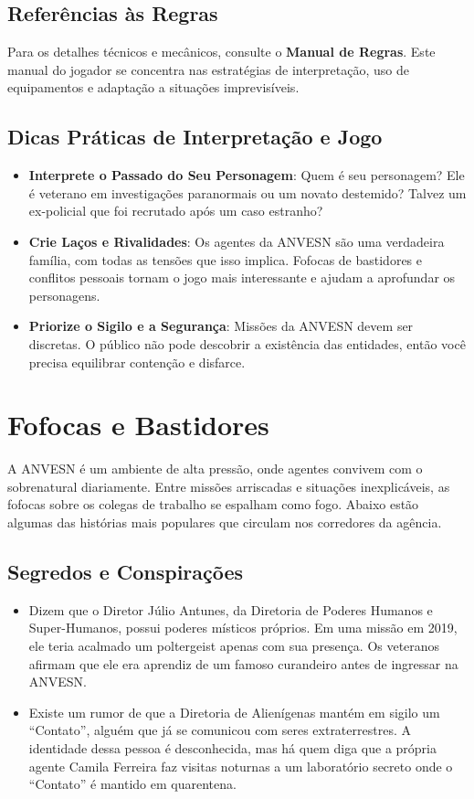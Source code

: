 \documentclass{book}
\begin{document}
\section{Referências às Regras}
Para os detalhes técnicos e mecânicos, consulte o \textbf{Manual de Regras}. Este manual do jogador se concentra nas estratégias de interpretação, uso de equipamentos e adaptação a situações imprevisíveis.

\section{Dicas Práticas de Interpretação e Jogo}
\begin{itemize}
    \item \textbf{Interprete o Passado do Seu Personagem}: Quem é seu personagem? Ele é veterano em investigações paranormais ou um novato destemido? Talvez um ex-policial que foi recrutado após um caso estranho?
    \item \textbf{Crie Laços e Rivalidades}: Os agentes da ANVESN são uma verdadeira família, com todas as tensões que isso implica. Fofocas de bastidores e conflitos pessoais tornam o jogo mais interessante e ajudam a aprofundar os personagens.
    \item \textbf{Priorize o Sigilo e a Segurança}: Missões da ANVESN devem ser discretas. O público não pode descobrir a existência das entidades, então você precisa equilibrar contenção e disfarce.
\end{itemize}

\chapter{Fofocas e Bastidores}
A ANVESN é um ambiente de alta pressão, onde agentes convivem com o sobrenatural diariamente. Entre missões arriscadas e situações inexplicáveis, as fofocas sobre os colegas de trabalho se espalham como fogo. Abaixo estão algumas das histórias mais populares que circulam nos corredores da agência.

\section{Segredos e Conspirações}
\begin{itemize}
    \item Dizem que o Diretor Júlio Antunes, da Diretoria de Poderes Humanos e Super-Humanos, possui poderes místicos próprios. Em uma missão em 2019, ele teria acalmado um poltergeist apenas com sua presença. Os veteranos afirmam que ele era aprendiz de um famoso curandeiro antes de ingressar na ANVESN.
    \item Existe um rumor de que a Diretoria de Alienígenas mantém em sigilo um “Contato”, alguém que já se comunicou com seres extraterrestres. A identidade dessa pessoa é desconhecida, mas há quem diga que a própria agente Camila Ferreira faz visitas noturnas a um laboratório secreto onde o “Contato” é mantido em quarentena.
\end{itemize}
\end{document}
